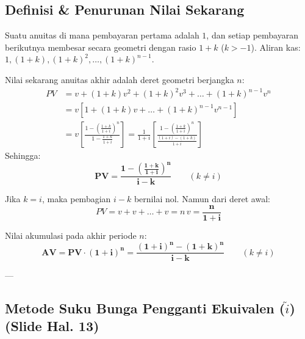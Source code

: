 \documentclass[11pt,a4paper]{article}
\begin{document}
\subsection{Definisi \& Penurunan Nilai Sekarang}

\begin{definitionbox}
Suatu anuitas di mana pembayaran pertama adalah $1$, dan setiap pembayaran berikutnya membesar secara geometri dengan rasio $1+k$ ($k > -1$).
Aliran kas: $1, (1+k), (1+k)^2, \dots, (1+k)^{n-1}$.
\end{definitionbox}

Nilai sekarang anuitas akhir adalah deret geometri berjangka $n$:
\begin{align*}
    PV &= v + (1+k) v^2 + (1+k)^2 v^3 + \dots + (1+k)^{n-1} v^n \\
       &= v \left[ 1 + (1+k)v + \dots + (1+k)^{n-1} v^{n-1} \right] \\
       &= v \left[ \frac{1 - \left(\frac{1+k}{1+i}\right)^n}{1 - \frac{1+k}{1+i}} \right] = \frac{1}{1+i} \left[ \frac{1 - \left(\frac{1+k}{1+i}\right)^n}{\frac{(1+i) - (1+k)}{1+i}} \right]
\end{align*}
Sehingga:
\begin{equation}
    \mathbf{PV = \frac{1 - \left(\frac{1+k}{1+i}\right)^n}{i - k}} \qquad (k \ne i)
\end{equation}
\begin{notebox}[Kasus Khusus $k = i$]
Jika $k = i$, maka pembagian $i - k$ bernilai nol. Namun dari deret awal:
\begin{equation*}
    PV = v + v + \dots + v = n \, v = \mathbf{\frac{n}{1+i}}
\end{equation*}
\end{notebox}

Nilai akumulasi pada akhir periode $n$:
\begin{equation}
    \mathbf{AV = PV \cdot (1+i)^n = \frac{(1+i)^n - (1+k)^n}{i - k}} \qquad (k \ne i)
\end{equation}

---

\subsection{Metode Suku Bunga Pengganti Ekuivalen (\texorpdfstring{$\tilde{i}$}{i_tilde}) (Slide Hal. 13)}
\end{document}
